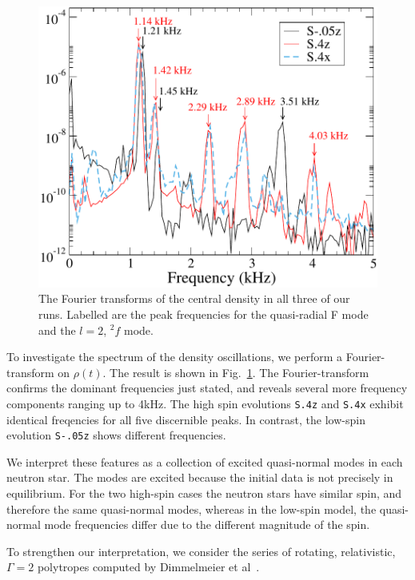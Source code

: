 {%
\begin{figure}
\includegraphics[width=0.95\columnwidth]{chap2/Density_FFT}
\caption[The Fourier transforms of the central density in all three of our runs.]{\label{fig:Density_FFT} The Fourier transforms of the central
  density in all three of our runs. Labelled are the peak frequencies
  for the quasi-radial F mode and the $l=2$, $^2f$ mode.}
\end{figure}

To investigate the spectrum of the density oscillations, we perform a
Fourier-transform on $\rho(t)$.  The result is shown in
Fig.~\ref{fig:Density_FFT}.  The Fourier-transform confirms the
dominant frequencies just stated, and reveals several more frequency
components ranging up to 4kHz.  The high spin evolutions {\tt S.4z} and
{\tt S.4x} exhibit identical freqencies for all five discernible peaks.  In
contrast, the low-spin evolution {\tt S-.05z} shows different frequencies.  

We interpret these features as a collection of excited quasi-normal
modes in each neutron star.  The modes are excited because the initial
data is not precisely in equilibrium.  For the two high-spin cases the
neutron stars have similar spin, and therefore the same quasi-normal
modes, whereas in the low-spin model, the quasi-normal mode
frequencies differ due to the different magnitude of the spin.

To strengthen our interpretation, we consider the series of rotating,
relativistic, $\Gamma=2$ polytropes computed by Dimmelmeier et
al~\cite{Dimmelmeier:2005zk}. 

}
